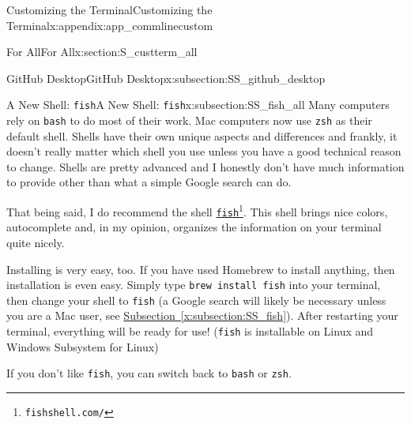 \documentclass[oneside,10pt,]{book}
\newcommand{\xreffont}{\relax}
\newcommand{\mono}[1]{\texttt{#1}}
\begin{document}
\begin{appendixptx}{Customizing the Terminal}{}{Customizing the Terminal}{}{}{x:appendix:app_commlinecustom}
\begin{sectionptx}{For All}{}{For All}{}{}{x:section:S_custterm_all}
\begin{subsectionptx}{GitHub Desktop}{}{GitHub Desktop}{}{}{x:subsection:SS_github_desktop}
\end{subsectionptx}
%
%
\typeout{************************************************}
\typeout{Subsection A.4.3 A New Shell: \mono{fish}}
\typeout{************************************************}
%
\begin{subsectionptx}{A New Shell: \mono{fish}}{}{A New Shell: \mono{fish}}{}{}{x:subsection:SS_fish_all}
%
%
Many computers rely on \mono{bash} to do most of their work. Mac computers now use \mono{zsh} as their default shell. Shells have their own unique aspects and differences and frankly, it doesn't really matter which shell you use unless you have a good technical reason to change. Shells are pretty advanced and I honestly don't have much information to provide other than what a simple Google search can do.%
\par
That being said, I do recommend the shell \href{https://fishshell.com/}{\mono{fish}}\footnote{\nolinkurl{fishshell.com/}\label{g:fn:idp616920120}}. This shell brings nice colors, autocomplete and, in my opinion, organizes the information on your terminal quite nicely.%
\par
Installing is very easy, too. If you have used Homebrew to install anything, then installation is even easy. Simply type \mono{brew install fish} into your terminal, then change your shell to \mono{fish} (a Google search will likely be necessary unless you are a Mac user, see \hyperref[x:subsection:SS_fish]{Subsection~{\xreffont\ref{x:subsection:SS_fish}}}). After restarting your terminal, everything will be ready for use! (\mono{fish} is installable on Linux and Windows Subsystem for Linux)%
\par
If you don't like \mono{fish}, you can switch back to \mono{bash} or \mono{zsh}.%
\end{subsectionptx}
\end{sectionptx}
\end{appendixptx}
%
%
\typeout{************************************************}
\typeout{************************************************}
%
\end{document}
